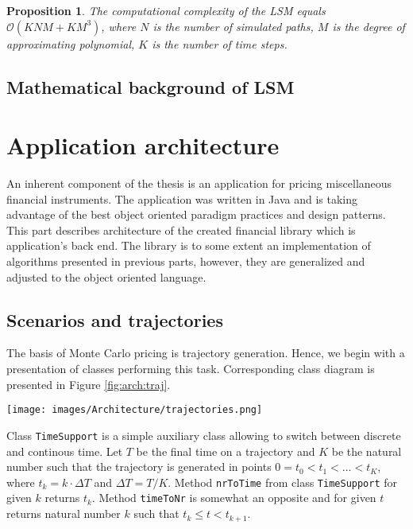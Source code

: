 \documentclass[a4paper,11pt, twoside]{book}
\newtheorem{prop}[thm]{Proposition}
\theoremstyle{definition}
\theoremstyle{remark}
\begin{document}
\begin{prop}
 The computational complexity of the LSM equals $\mathcal{O}(KNM + KM^3)$, where $N$ is the number of simulated paths, $M$ is the degree of approximating polynomial, $K$ is the number of time steps.
\end{prop}

\section{Mathematical background of LSM}

\chapter{Application architecture}
An inherent component of the thesis is an application for pricing miscellaneous financial instruments. The application was written in Java and is taking advantage of the best object oriented paradigm practices and design patterns. This part describes architecture of the created financial library which is application's back end. The library is to some extent an implementation of algorithms presented in previous parts, however, they are generalized and adjusted to the object oriented language.

\section{Scenarios and trajectories}
The basis of Monte Carlo pricing is trajectory generation. Hence, we begin with a presentation of classes performing this task. Corresponding class diagram is presented in Figure \ref{fig:arch:traj}.

\begin{sidewaysfigure}
\centering
 \texttt{[image: images/Architecture/trajectories.png]}
\caption{Diagram presenting classes designated for scenario generation.}
\label{fig:arch:traj}
\end{sidewaysfigure}

Class \texttt{TimeSupport} is a simple auxiliary class allowing to switch between discrete and continous time. Let $T$ be the final time on a trajectory and $K$ be the natural number such that the trajectory is generated in points $0 = t_0 < t_1 < \ldots < t_K$, where $t_k = k \cdot \Delta T$ and $\Delta T = T / K$. Method \texttt{nrToTime} from class \texttt{TimeSupport} for given $k$ returns $t_k$. Method \texttt{timeToNr} is somewhat an opposite and for given $t$ returns natural number $k$ such that $t_k \leq t < t_{k+1}$. 
\end{document}

